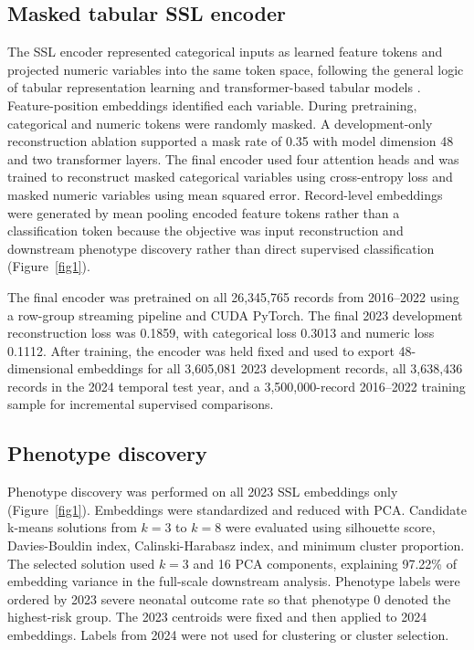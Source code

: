 \documentclass[pdflatex,sn-vancouver-num]{sn-jnl}
\begin{document}
\subsection{Masked tabular SSL encoder}\label{subsec:ssl}

The SSL encoder represented categorical inputs as learned feature tokens and projected numeric variables into the same token space, following the general logic of tabular representation learning and transformer-based tabular models \cite{yoon2020vime,huang2020tabtransformer,somepalli2021saint,gorishniy2021revisiting}. Feature-position embeddings identified each variable. During pretraining, categorical and numeric tokens were randomly masked. A development-only reconstruction ablation supported a mask rate of 0.35 with model dimension 48 and two transformer layers. The final encoder used four attention heads and was trained to reconstruct masked categorical variables using cross-entropy loss and masked numeric variables using mean squared error. Record-level embeddings were generated by mean pooling encoded feature tokens rather than a classification token because the objective was input reconstruction and downstream phenotype discovery rather than direct supervised classification (Figure~\ref{fig1}).

The final encoder was pretrained on all 26,345,765 records from 2016--2022 using a row-group streaming pipeline and CUDA PyTorch. The final 2023 development reconstruction loss was 0.1859, with categorical loss 0.3013 and numeric loss 0.1112. After training, the encoder was held fixed and used to export 48-dimensional embeddings for all 3,605,081 2023 development records, all 3,638,436 records in the 2024 temporal test year, and a 3,500,000-record 2016--2022 training sample for incremental supervised comparisons.

\subsection{Phenotype discovery}\label{subsec:phenotype-discovery}

Phenotype discovery was performed on all 2023 SSL embeddings only (Figure~\ref{fig1}). Embeddings were standardized and reduced with PCA. Candidate k-means solutions from $k = 3$ to $k = 8$ were evaluated using silhouette score, Davies-Bouldin index, Calinski-Harabasz index, and minimum cluster proportion. The selected solution used $k = 3$ and 16 PCA components, explaining 97.22\% of embedding variance in the full-scale downstream analysis. Phenotype labels were ordered by 2023 severe neonatal outcome rate so that phenotype 0 denoted the highest-risk group. The 2023 centroids were fixed and then applied to 2024 embeddings. Labels from 2024 were not used for clustering or cluster selection.
\end{document}

